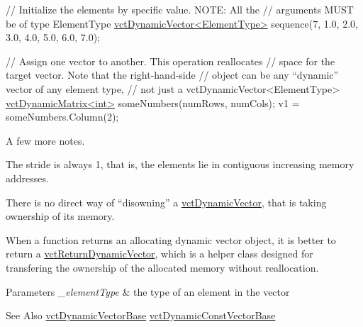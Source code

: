 \begin{DoxyEnumerate}
\begin{DoxyCode}
\textcolor{comment}{// Initialize the elements by specific value.  NOTE: All the}
\textcolor{comment}{// arguments MUST be of type ElementType}
\hyperlink{classvct_dynamic_vector}{vctDynamicVector<ElementType>} sequence(7,
                                       1.0, 2.0, 3.0, 4.0, 5.0, 6.0, 7.0);

\textcolor{comment}{// Assign one vector to another.  This operation reallocates}
\textcolor{comment}{// space for the target vector.  Note that the right-hand-side}
\textcolor{comment}{// object can be any ``dynamic'' vector of any element type,}
\textcolor{comment}{// not just a vctDynamicVector<ElementType>}
\hyperlink{classvct_dynamic_matrix}{vctDynamicMatrix<int>} someNumbers(numRows, numCols);
v1 = someNumbers.Column(2);
\end{DoxyCode}
 
\end{DoxyEnumerate}

A few more notes. 
\begin{DoxyItemize}
\item The stride is always 1, that is, the elements lie in contiguous increasing memory addresses. 
\item There is no direct way of ``disowning'' a \hyperlink{classvct_dynamic_vector}{vct\-Dynamic\-Vector}, that is taking ownership of its memory. 
\item When a function returns an allocating dynamic vector object, it is better to return a \hyperlink{classvct_return_dynamic_vector}{vct\-Return\-Dynamic\-Vector}, which is a helper class designed for transfering the ownership of the allocated memory without reallocation. 
\end{DoxyItemize}


\begin{DoxyParams}{Parameters}
{\em \-\_\-element\-Type} & the type of an element in the vector\\
\hline
\end{DoxyParams}
\begin{DoxySeeAlso}{See Also}
\hyperlink{classvct_dynamic_vector_base}{vct\-Dynamic\-Vector\-Base} \hyperlink{classvct_dynamic_const_vector_base}{vct\-Dynamic\-Const\-Vector\-Base} 
\end{DoxySeeAlso}


